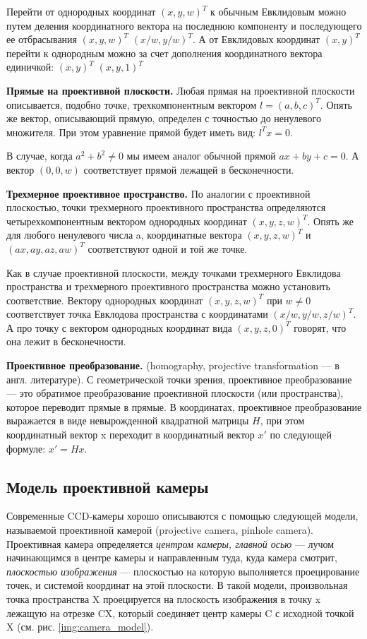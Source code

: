 Перейти от однородных координат $(x, y, w)^T$ к обычным Евклидовым можно путем деления координатного вектора на последнюю компоненту и последующего ее отбрасывания $(x,y,w)^T$ $(x/w,y/w)^T$. А от Евклидовых координат $(x,y)^T$ перейти к однородным можно за счет дополнения координатного вектора единичкой: $(x,y)^T$ $(x,y,1)^T$

\textbf{Прямые на проективной плоскости.} Любая прямая на проективной плоскости описывается, подобно точке, трехкомпонентным вектором $l = (a,b,c)^T$. Опять же вектор, описывающий прямую, определен с точностью до ненулевого множителя. При этом уравнение прямой будет иметь вид: $l^T x = 0$.

В случае, когда $a^2 + b^2 \neq 0$ мы имеем аналог обычной прямой $ax + by + c = 0$. А вектор $(0,0,w)$ соответствует прямой лежащей в бесконечности.

\textbf{Трехмерное проективное пространство.} По аналогии с проективной плоскостью, точки трехмерного проективного пространства определяются четырехкомпонентным вектором однородных координат $(x,y,z,w)^T$. Опять же для любого ненулевого числа a, координатные вектора $(x,y,z,w)^T$ и $(ax,ay,az,aw)^T$ соответствуют одной и той же точке.

Как в случае проективной плоскости, между точками трехмерного Евклидова пространства и трехмерного проективного пространства можно установить соответствие. Вектору однородных координат $(x,y,z,w)^T$ при $w \neq 0$ соответствует точка Евклодова пространства с координатами $(x/w,y/w,z/w)^T$. А про точку с вектором однородных координат вида $(x,y,z,0)^T$ говорят, что она лежит в бесконечности.

\textbf{Проективное преобразование.} (homography, projective transformation — в англ. литературе). С геометрической точки зрения, проективное преобразование — это обратимое преобразование проективной плоскости (или пространства), которое переводит прямые в прямые. В координатах, проективное преобразование выражается в виде невырожденной квадратной матрицы $H$, при этом координатный вектор x переходит в координатный вектор $x'$ по следующей формуле: $x' = H x$.

\subsection{Модель проективной камеры}
Современные CCD-камеры хорошо описываются с помощью следующей модели, называемой проективной камерой (projective camera, pinhole camera). Проективная камера определяется \textit{центром камеры, главной осью} — лучом начинающимся в центре камеры и направленным туда, куда камера смотрит, \textit{плоскостью изображения} — плоскостью на которую выполняется проецирование точек, и системой координат на этой плоскости. В такой модели, произвольная точка пространства X проецируется на плоскость изображения в точку x лежащую на отрезке CX, который соединяет центр камеры C с исходной точкой X (см. рис. \ref{img:camera_model}).

